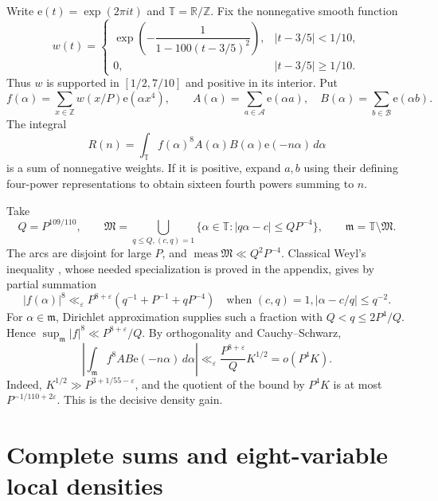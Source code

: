 \documentclass[11pt]{article}
\theoremstyle{remark}\newtheorem*{remark}{Remark}
\newcommand{\e}{\mathrm e}
\newcommand{\T}{\mathbb T}
\newcommand{\eps}{\varepsilon}
\newcommand{\M}{\mathfrak M}
\newcommand{\m}{\mathfrak m}
\DeclareMathOperator{\meas}{meas}
\begin{document}
Write \(\e(t)=\exp(2\pi it)\) and \(\T=\mathbb R/\mathbb Z\).
Fix the nonnegative smooth function
\[
 w(t)=\begin{cases}
 \exp\!\left(-\dfrac1{1-100(t-3/5)^2}\right),&|t-3/5|<1/10,\\
 0,&|t-3/5|\ge1/10.
 \end{cases}
\]
Thus \(w\) is supported in \([1/2,7/10]\) and positive in its interior.
Put
\[
 f(\alpha)=\sum_{x\in\mathbb Z}w(x/P)\e(\alpha x^4),\qquad
 A(\alpha)=\sum_{a\in\mathcal A}\e(\alpha a),\quad
 B(\alpha)=\sum_{b\in\mathcal B}\e(\alpha b).
\]
The integral
\begin{equation}\label{eq:count}
 R(n)=\int_\T f(\alpha)^8A(\alpha)B(\alpha)\e(-n\alpha)\,d\alpha
\end{equation}
is a sum of nonnegative weights. If it is positive, expand \(a,b\)
using their defining four-power representations to obtain sixteen fourth
powers summing to \(n\).

Take
\[
 Q=P^{109/110},\qquad
 \M=\bigcup_{q\le Q,(c,q)=1}
 \{\alpha\in\T:|q\alpha-c|\le QP^{-4}\},
 \qquad\m=\T\setminus\M.
\]
The arcs are disjoint for large \(P\), and
\(\meas\M\ll Q^2P^{-4}\).
Classical Weyl's inequality \cite[Lemma~2.4]{Vaughan}, whose needed
specialization is proved in the appendix, gives by partial summation
\begin{equation}\label{eq:weyl}
 |f(\alpha)|^8\ll_\eps P^{8+\eps}
 (q^{-1}+P^{-1}+qP^{-4})
 \quad\text{when }(c,q)=1, |\alpha-c/q|\le q^{-2}.
\end{equation}
For \(\alpha\in\m\), Dirichlet approximation supplies such a fraction
with \(Q<q\le2P^4/Q\). Hence \(\sup_\m|f|^8\ll P^{8+\eps}/Q\).
By orthogonality and Cauchy--Schwarz,
\begin{equation}\label{eq:minor}
 \left|\int_\m f^8AB\e(-n\alpha)\,d\alpha\right|
 \ll_\eps \frac{P^{8+\eps}}Q K^{1/2}
 =o(P^4K).
\end{equation}
Indeed, \(K^{1/2}\gg P^{3+1/55-\eps}\), and the quotient of the
bound by \(P^4K\) is at most
\(P^{-1/110+2\eps}\). This is the decisive density gain.

\section{Complete sums and eight-variable local densities}
\end{document}
